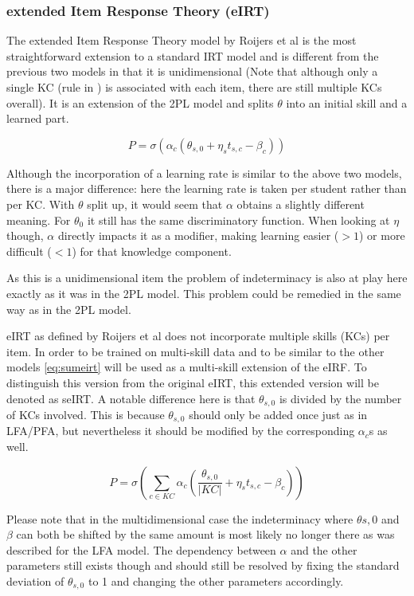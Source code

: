 \documentclass{scrartcl}
\begin{document}
\subsubsection{extended Item Response Theory (eIRT)}
\label{sec:eirt}
The extended Item Response Theory model by Roijers et al \cite{eirt} is the most straightforward extension to a standard IRT model and is different from the previous two models in that it is unidimensional (Note that although only a single KC (rule in \cite{eirt}) is associated with each item, there are still multiple KCs overall).  It is an extension of the 2PL model and splits $\theta$ into an initial skill and a learned part. 

\begin{equation}
\label{eq:eirt}
P = \sigma(\alpha_{c} (\theta_{s,0} + \eta_{s} t_{s,c} - \beta_{c}))
\end{equation}

Although the incorporation of a learning rate is similar to the above two models, there is a major difference: here the learning rate is taken per student rather than per KC. With $\theta$ split up, it would seem that $\alpha$ obtains a slightly different meaning. For $\theta_{0}$ it still has the same discriminatory function. When looking at $\eta$ though, $\alpha$ directly impacts it as a modifier, making learning easier ($>1$) or more difficult ($<1$) for that knowledge component.

As this is a unidimensional item the problem of indeterminacy is also at play here exactly as it was in the 2PL model. This problem could be remedied in the same way as in the 2PL model.

eIRT as defined by Roijers et al does not incorporate multiple skills (KCs) per item. In order to be trained on multi-skill data and to be similar to the other models \ref{eq:sumeirt} will be used as a multi-skill extension of the eIRF. To distinguish this version from the original eIRT, this extended version will be denoted as seIRT. A notable difference here is that $\theta_{s,0}$ is divided by the number of KCs involved. This is because $\theta_{s,0}$ should only be added once just as in LFA/PFA, but nevertheless it should be modified by the corresponding $\alpha_{c}$s as well.

\begin{equation}
\label{eq:sumeirt}
P = \sigma(\sum_{c \in KC} \alpha_{c}(\frac{\theta_{s,0}}{|KC|} + \eta_{s} t_{s,c} - \beta_{c}))
\end{equation}

Please note that in the multidimensional case the indeterminacy where $\theta{s,0}$ and $\beta$ can both be shifted by the same amount is most likely no longer there as was described for the LFA model. The dependency between $\alpha$ and the other parameters still exists though and should still be resolved by fixing the standard deviation of $\theta_{s,0}$ to 1 and changing the other parameters accordingly.
\end{document}
